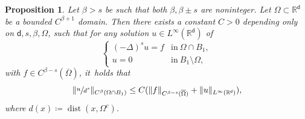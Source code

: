 \documentclass[10pt]{amsart}
\theoremstyle{plain}
\newtheorem{prop}[thm]{Proposition}
\theoremstyle{definition}
\DeclareMathOperator{\dist}{dist}
\newcommand{\R}{{\mathbb{R}}}
\let\be\beta
\let\ol\overline
\renewcommand{\d}{\mathsf{d}}
\begin{document}
\begin{prop}\label{lem:ArO2}
Let $\be>s$ be such that both $\be, \be\pm s$ are noninteger. Let $\Omega\subset\R^\d$ be a bounded $C^{\be+1}$ domain. Then there exists a constant $C>0$ depending only on $\d,s,\be,\Omega$, such that for any solution $u\in L^\infty(\R^\d)$ of
\begin{equation}\label{eq:SchaBVP}
\begin{cases}
(-\Delta)^s u = f & \text{in} \ \Omega\cap B_1,\\
u = 0 & \text{in} \ B_1\setminus\Omega,
\end{cases}
\end{equation}
with $f\in C^{\be-s}(\ol\Omega)$, it~holds that
\begin{equation}\label{eq:ArO2}
\|\sfrac{u}{d^s}\|_{C^\be({\Omega}\cap B_1)} \le C(\|f\|_{C^{\be-s}(\ol\Omega)} + \|u\|_{L^\infty(\R^\d)}),
\end{equation}
{where $d(x)\coloneqq \dist(x,\Omega^c)$.}
\end{prop}
\end{document}
